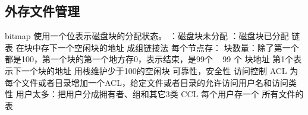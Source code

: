 \documentclass{ctexart}
\begin{document}
\subsection{外存文件管理}
\begin{outline}
    \1 bitmap
        \2 使用一个位表示磁盘块的分配状态。
            ：磁盘块未分配
            ：磁盘块已分配
    \1 链表
        \2 在块中存下一个空闲块的地址
    \1 成组链接法
        \2 每个节点存：
            \3 块数量：除了第一个都是100，第一个块的第一个地方存0，表示结束，是99个
             ~ 99 个 块地址
            \3 第1个表示下一个块的地址
            \3 用栈维护少于100的空闲块
    \1 可靠性，安全性
    \1 访问控制
        \2 ACL
        \3 为每个文件或者目录增加一个ACL，给定文件或者目录的允许访问用户名和访问类性
        \3 用户太多：把用户分成拥有者、组和其它3类
        \2 CCL
            \3 每个用户存一个 所有文件的表



\end{outline}
\end{document}
